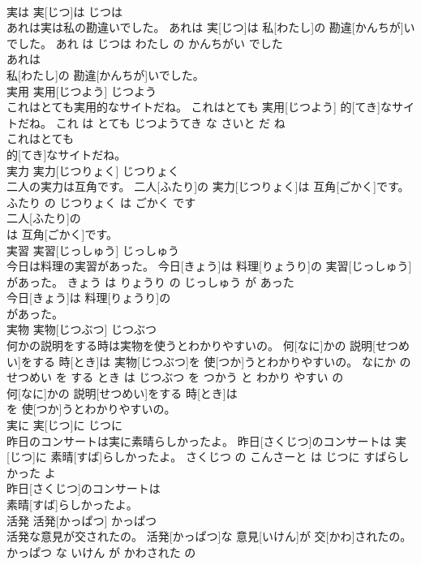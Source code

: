 \documentclass[8pt]{extreport}
\begin{document}
\begin{CJK}{UTF8}{min}
\\	実は	実[じつ]は	じつは	
\\	あれは実は私の勘違いでした。	あれは 実[じつ]は 私[わたし]の 勘違[かんちが]いでした。	あれ は じつは わたし の かんちがい でした	
\\	あれは
\\	私[わたし]の 勘違[かんちが]いでした。			
\\	実用	実用[じつよう]	じつよう	
\\	これはとても実用的なサイトだね。	これはとても 実用[じつよう] 的[てき]なサイトだね。	これ は とても じつようてき な さいと だ ね	
\\	これはとても
\\	的[てき]なサイトだね。			
\\	実力	実力[じつりょく]	じつりょく	
\\	二人の実力は互角です。	二人[ふたり]の 実力[じつりょく]は 互角[ごかく]です。	ふたり の じつりょく は ごかく です	
\\	二人[ふたり]の
\\	は 互角[ごかく]です。			
\\	実習	実習[じっしゅう]	じっしゅう	
\\	今日は料理の実習があった。	今日[きょう]は 料理[りょうり]の 実習[じっしゅう]があった。	きょう は りょうり の じっしゅう が あった	
\\	今日[きょう]は 料理[りょうり]の
\\	があった。			
\\	実物	実物[じつぶつ]	じつぶつ	
\\	何かの説明をする時は実物を使うとわかりやすいの。	何[なに]かの 説明[せつめい]をする 時[とき]は 実物[じつぶつ]を 使[つか]うとわかりやすいの。	なにか の せつめい を する とき は じつぶつ を つかう と わかり やすい の	
\\	何[なに]かの 説明[せつめい]をする 時[とき]は
\\	を 使[つか]うとわかりやすいの。			
\\	実に	実[じつ]に	じつに	
\\	昨日のコンサートは実に素晴らしかったよ。	昨日[さくじつ]のコンサートは 実[じつ]に 素晴[すば]らしかったよ。	さくじつ の こんさーと は じつに すばらしかった よ	
\\	昨日[さくじつ]のコンサートは
\\	素晴[すば]らしかったよ。			
\\	活発	活発[かっぱつ]	かっぱつ	
\\	活発な意見が交されたの。	活発[かっぱつ]な 意見[いけん]が 交[かわ]されたの。	かっぱつ な いけん が かわされた の	

\end{CJK}
\end{document}
